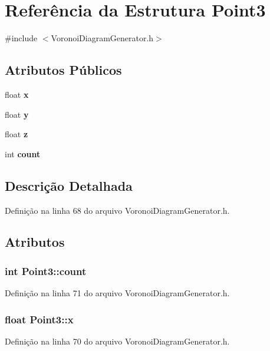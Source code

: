\section{Referência da Estrutura Point3}
\label{struct_point3}


{\ttfamily \#include $<$Voronoi\+Diagram\+Generator.\+h$>$}

\subsection*{Atributos Públicos}
\begin{DoxyCompactItemize}
\item 
float {\bf x}
\item 
float {\bf y}
\item 
float {\bf z}
\item 
int {\bf count}
\end{DoxyCompactItemize}


\subsection{Descrição Detalhada}


Definição na linha 68 do arquivo Voronoi\+Diagram\+Generator.\+h.



\subsection{Atributos}
\subsubsection[{count}]{\setlength{\rightskip}{0pt plus 5cm}int Point3\+::count}\label{struct_point3_aee0ec8ac449a995b2f50fd2fc48f807a}


Definição na linha 71 do arquivo Voronoi\+Diagram\+Generator.\+h.

\subsubsection[{x}]{\setlength{\rightskip}{0pt plus 5cm}float Point3\+::x}\label{struct_point3_a12b90b9f335499323488109dfef2c46a}


Definição na linha 70 do arquivo Voronoi\+Diagram\+Generator.\+h.

